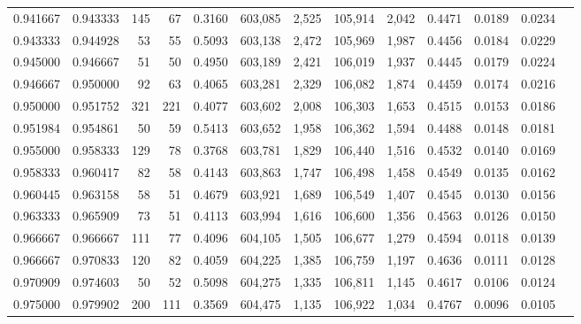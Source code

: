 \begin{tabular}{rrrrrrrrrrrrr}
0.941667 & 0.943333 &    145 &    67 &                                     0.3160 & 603,085 &   2,525 & 105,914 &   2,042 & 0.4471 & 0.0189 & 0.0234 \\
0.943333 & 0.944928 &     53 &    55 &                                     0.5093 & 603,138 &   2,472 & 105,969 &   1,987 & 0.4456 & 0.0184 & 0.0229 \\
0.945000 & 0.946667 &     51 &    50 &                                     0.4950 & 603,189 &   2,421 & 106,019 &   1,937 & 0.4445 & 0.0179 & 0.0224 \\
0.946667 & 0.950000 &     92 &    63 &                                     0.4065 & 603,281 &   2,329 & 106,082 &   1,874 & 0.4459 & 0.0174 & 0.0216 \\
0.950000 & 0.951752 &    321 &   221 &                                     0.4077 & 603,602 &   2,008 & 106,303 &   1,653 & 0.4515 & 0.0153 & 0.0186 \\
0.951984 & 0.954861 &     50 &    59 &                                     0.5413 & 603,652 &   1,958 & 106,362 &   1,594 & 0.4488 & 0.0148 & 0.0181 \\
0.955000 & 0.958333 &    129 &    78 &                                     0.3768 & 603,781 &   1,829 & 106,440 &   1,516 & 0.4532 & 0.0140 & 0.0169 \\
0.958333 & 0.960417 &     82 &    58 &                                     0.4143 & 603,863 &   1,747 & 106,498 &   1,458 & 0.4549 & 0.0135 & 0.0162 \\
0.960445 & 0.963158 &     58 &    51 &                                     0.4679 & 603,921 &   1,689 & 106,549 &   1,407 & 0.4545 & 0.0130 & 0.0156 \\
0.963333 & 0.965909 &     73 &    51 &                                     0.4113 & 603,994 &   1,616 & 106,600 &   1,356 & 0.4563 & 0.0126 & 0.0150 \\
0.966667 & 0.966667 &    111 &    77 &                                     0.4096 & 604,105 &   1,505 & 106,677 &   1,279 & 0.4594 & 0.0118 & 0.0139 \\
0.966667 & 0.970833 &    120 &    82 &                                     0.4059 & 604,225 &   1,385 & 106,759 &   1,197 & 0.4636 & 0.0111 & 0.0128 \\
0.970909 & 0.974603 &     50 &    52 &                                     0.5098 & 604,275 &   1,335 & 106,811 &   1,145 & 0.4617 & 0.0106 & 0.0124 \\
0.975000 & 0.979902 &    200 &   111 &                                     0.3569 & 604,475 &   1,135 & 106,922 &   1,034 & 0.4767 & 0.0096 & 0.0105 \\

\end{tabular}
